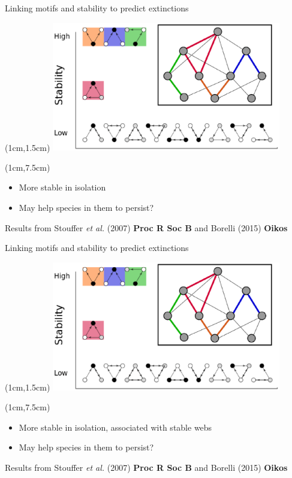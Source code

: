 \documentclass{beamer}
\newcommand*\whitem{%
  \item[\color{white}\scalebox{0.9}{\textbullet}]}
\begin{document}
  \begin{frame}{Linking motifs and stability to predict extinctions}
      \begin{textblock*}{10cm}(1cm,1.5cm)
        \includegraphics[width=10cm]{intro_figs/motifs_vs_stability.eps}
        \end{textblock*} 

      \begin{textblock*}{10cm}(1cm,7.5cm)
        \begin{itemize}
          \item More stable in isolation
          \whitem {\color{white}May help species in them to persist?}
        \end{itemize}
        {\tiny Results from Stouffer \emph{et al.} (2007) \textbf{Proc R Soc B} and Borelli (2015) \textbf{Oikos}}
        \end{textblock*}
    \end{frame}

  \begin{frame}{Linking motifs and stability to predict extinctions}
      \begin{textblock*}{10cm}(1cm,1.5cm)
        \includegraphics[width=10cm]{intro_figs/motifs_vs_stability.eps}
        \end{textblock*} 

      \begin{textblock*}{10cm}(1cm,7.5cm)
        \begin{itemize}
          \item More stable in isolation, associated with stable webs
          \whitem {\color{white}May help species in them to persist?}
        \end{itemize}
        {\tiny Results from Stouffer \emph{et al.} (2007) \textbf{Proc R Soc B} and Borelli (2015) \textbf{Oikos}}
        \end{textblock*}
    \end{frame}
\end{document}
